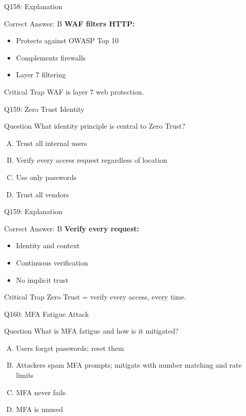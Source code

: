 \documentclass{beamer}
\begin{document}
	\begin{frame}{Q158: Explanation}
		\begin{block}{Correct Answer: B}
			\textbf{WAF filters HTTP:}
			\begin{itemize}
				\item Protects against OWASP Top 10
				\item Complements firewalls
				\item Layer 7 filtering
			\end{itemize}
		\end{block}
		\begin{alertblock}{Critical Trap}
			WAF is layer 7 web protection.
		\end{alertblock}
	\end{frame}
	
	\begin{frame}{Q159: Zero Trust Identity}
		\begin{block}{Question}
			What identity principle is central to Zero Trust?
		\end{block}
		\begin{enumerate}[(A)]
			\item Trust all internal users
			\item Verify every access request regardless of location
			\item Use only passwords
			\item Trust all vendors
		\end{enumerate}
	\end{frame}
	
	\begin{frame}{Q159: Explanation}
		\begin{block}{Correct Answer: B}
			\textbf{Verify every request:}
			\begin{itemize}
				\item Identity and context
				\item Continuous verification
				\item No implicit trust
			\end{itemize}
		\end{block}
		\begin{alertblock}{Critical Trap}
			Zero Trust = verify every access, every time.
		\end{alertblock}
	\end{frame}
	
	\begin{frame}{Q160: MFA Fatigue Attack}
		\begin{block}{Question}
			What is MFA fatigue and how is it mitigated?
		\end{block}
		\begin{enumerate}[(A)]
			\item Users forget passwords; reset them
			\item Attackers spam MFA prompts; mitigate with number matching and rate limits
			\item MFA never fails
			\item MFA is unused
		\end{enumerate}
	\end{frame}
	
\end{document}
